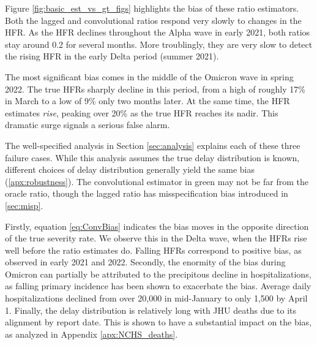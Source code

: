 \documentclass{article}
\newcommand{\ahcomment}[1]{{\color{red}[AH: #1]}}
\begin{document}
Figure \ref{fig:basic_est_vs_gt_figs} highlights the bias of these ratio estimators. Both the lagged and convolutional ratios respond very slowly to changes in the HFR. As the HFR declines throughout the Alpha wave in early 2021, both ratios stay around 0.2 for several months. More troublingly, they are very slow to detect the rising HFR in the early Delta period (summer 2021). %

The most significant bias comes in the middle of the Omicron wave in spring 2022. The true HFRs sharply decline in this period, from a high of roughly 17\% in March to a low of 9\% only two months later. At the same time, the HFR estimates \textit{rise}, peaking over 20\% as the true HFR reaches its nadir. This dramatic surge signals a serious false alarm. 

The well-specified analysis in Section \ref{sec:analysis} explains each of these three failure cases. While this analysis assumes the true delay distribution is known, different choices of delay distribution generally yield the same bias (\ref{apx:robustness}). The convolutional estimator in green may not be far from the oracle ratio, though the lagged ratio has misspecification bias introduced in \ref{sec:misp}. 

Firstly, equation \ref{eq:ConvBias} indicates the bias moves in the opposite direction of the true severity rate. We observe this in the Delta wave, when the HFRs rise well before the ratio estimates do.  
Falling HFRs correspond to positive bias, as observed in early 2021 and 2022. Secondly, the enormity of the bias during Omicron can partially be attributed to the precipitous decline in hospitalizations, as falling primary incidence has been shown to exacerbate the bias. Average daily hospitalizations declined from over 20,000 in mid-January to only 1,500 by April 1. Finally, the delay distribution is relatively long with JHU deaths due to its alignment by report date. This is shown to have a substantial impact on the bias, as analyzed in Appendix \ref{apx:NCHS_deaths}.
\end{document}
